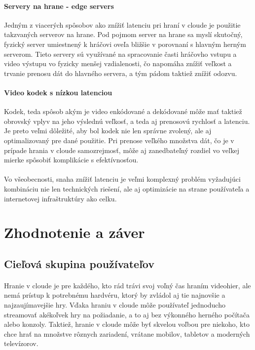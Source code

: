 \documentclass[10pt,twoside,slovak,a4paper]{article}
\begin{document}
\paragraph{Servery na hrane - edge servers} Jedným z viacerých spôsobov ako znížiť latenciu pri hraní v cloude je použitie takzvaných serverov na hrane. Pod pojmom server na hrane sa myslí skutočný, fyzický server umiestnený k hráčovi oveľa bližšie v porovnaní s hlavným herným serverom. Tieto servery sú využívané na spracovanie časti hráčovho vstupu a video výstupu vo fyzicky menšej vzdialenosti, čo napomáha znížiť veľkost a trvanie prenosu dát do hlavného servera, a tým pádom taktiež znížiť odozvu. \cite{8289317}

\paragraph{Video kodek s nízkou latenciou} Kodek, teda spôsob akým je video enkódované a dekódované môže mať taktiež obrovský vplyv na jeho výslednú veľkosť, a teda aj prenosovú rychlosť a latenciu. Je preto veľmi dôležité, aby bol kodek nie len správne zvolený, ale aj optimalizovaný pre dané použitie. Pri prenose veľkého množstva dát, čo je v prípade hrania v cloude samozrejmosť, môže aj zanedbateľný rozdiel vo veľkej mierke spôsobiť komplikácie s efektívnosťou.

\paragraph{} Vo všeobecnosti, snaha znížiť latenciu je veľmi komplexný problém vyžadujúci kombináciu nie len technických riešení, ale aj optimizácie na strane používateľa a internetovej infraštruktúry ako celku.



\section{Zhodnotenie a záver}

\subsection{Cieľová skupina používateľov}

\paragraph{} Hranie v cloude je pre každého, kto rád trávi svoj voľný čas hraním videohier, ale nemá prístup k potrebnému hardvéru, ktorý by zvládol aj tie najnovšie a najzaujímavejšie hry. Vďaka hraniu v cloude môže používateľ jednoducho streamovať akékoľvek hry na požiadanie, a to aj bez výkonného herného počítača alebo konzoly. Taktiež, hranie v cloude môže byť skvelou voľbou pre niekoho, kto chce hrať na množstve rôznych zariadení, vrátane mobilov, tabletov a moderných televízorov.
\end{document}
